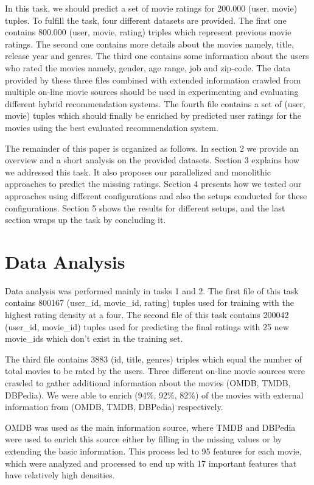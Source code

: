 \documentclass{sigish}
\begin{document}
In this task, we should predict a set of movie ratings for 200.000 (user, movie) tuples. To fulfill the task, four different datasets are provided. The first one contains 800.000 (user, movie, rating) triples which represent previous movie ratings. The second one contains more details about the movies namely, title, release year and genres. The third one contains some information about the users who rated the movies namely, gender, age range, job and zip-code. The data provided by these three files combined with extended information crawled from multiple on-line movie sources should be used in experimenting and evaluating different hybrid recommendation systems. The fourth file contains a set of (user, movie) tuples which should finally be enriched by predicted user ratings for the movies using the best evaluated recommendation system.

The remainder of this paper is organized as follows. In section 2 we provide an overview and a short analysis on the provided datasets. Section 3 explains how we addressed this task. It also proposes our parallelized and monolithic approaches to predict the missing ratings. Section 4 presents how we tested our approaches using different configurations and also the setups conducted for these configurations. Section 5 shows the results for different setups, and the last section wraps up the task by concluding it.

\section{Data Analysis}

Data analysis was performed mainly in tasks 1 and 2. The first file of this task contains 800167 (user\_id, movie\_id, rating) tuples used for training with the highest rating density at a four. The second file of this task contains 200042 (user\_id, movie\_id) tuples used for predicting the final ratings with 25 new movie\_ids which don't exist in the training set.

The third file contains 3883 (id, title, genres) triples which equal the number of total movies to be rated by the users. Three different on-line movie sources were crawled to gather additional information about the movies (OMDB, TMDB, DBPedia). We were able to enrich (94\%, 92\%, 82\%) of the movies with external information from (OMDB, TMDB, DBPedia) respectively.

OMDB was used as the main information source, where TMDB and DBPedia were used to enrich this source either by filling in the missing values or by extending the basic information. This process led to 95 features for each movie, which were analyzed and processed to end up with 17 important features that have relatively high densities.
\end{document}
